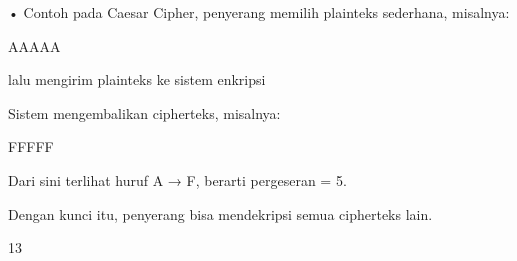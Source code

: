 \documentclass{article}
\begin{document}

• Contoh pada Caesar Cipher, penyerang memilih plainteks sederhana, misalnya: 

                     AAAAA

   lalu mengirim plainteks ke sistem enkripsi   

  Sistem mengembalikan cipherteks, misalnya:

                     FFFFF

   Dari sini terlihat huruf A → F, berarti pergeseran = 5.

   Dengan kunci itu, penyerang bisa mendekripsi semua cipherteks lain.

13
\end{document}
